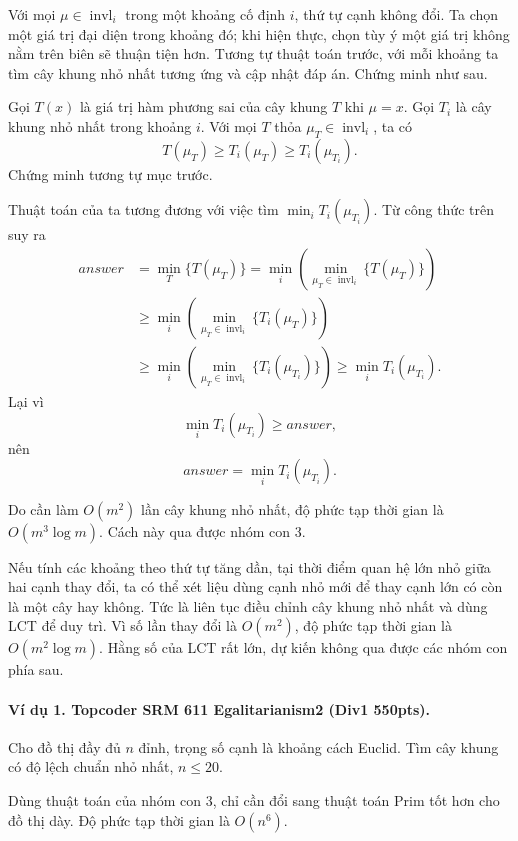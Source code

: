 \documentclass[11pt]{article}
\begin{document}
Với mọi \(\mu\in\operatorname{invl}_i\) trong một khoảng cố định \(i\), thứ tự
cạnh không đổi. Ta chọn một giá trị đại diện trong khoảng đó; khi hiện thực,
chọn tùy ý một giá trị không nằm trên biên sẽ thuận tiện hơn. Tương tự thuật
toán trước, với mỗi khoảng ta tìm cây khung nhỏ nhất tương ứng và cập nhật đáp
án. Chứng minh như sau.

Gọi \(T(x)\) là giá trị hàm phương sai của cây khung \(T\) khi \(\mu=x\). Gọi
\(T_i\) là cây khung nhỏ nhất trong khoảng \(i\). Với mọi \(T\) thỏa
\(\mu_T\in\operatorname{invl}_i\), ta có
\[
  T(\mu_T)\ge T_i(\mu_T)\ge T_i(\mu_{T_i}). \tag{3.4}
\]
Chứng minh tương tự mục trước.

Thuật toán của ta tương đương với việc tìm \(\min_i T_i(\mu_{T_i})\). Từ công
thức trên suy ra
\[
\begin{aligned}
  \textit{answer}
  &=\min_T\{T(\mu_T)\}
    =\min_i\left(\min_{\mu_T\in\operatorname{invl}_i}\{T(\mu_T)\}\right)\\
  &\ge \min_i\left(\min_{\mu_T\in\operatorname{invl}_i}\{T_i(\mu_T)\}\right)\\
  &\ge \min_i\left(\min_{\mu_T\in\operatorname{invl}_i}
      \{T_i(\mu_{T_i})\}\right)
    \ge \min_i T_i(\mu_{T_i}).
\end{aligned}
\]
Lại vì
\[
  \min_i T_i(\mu_{T_i})\ge \textit{answer},
\]
nên
\[
  \textit{answer}=\min_i T_i(\mu_{T_i}).
\]

Do cần làm \(O(m^2)\) lần cây khung nhỏ nhất, độ phức tạp thời gian là
\(O(m^3\log m)\). Cách này qua được nhóm con 3.

Nếu tính các khoảng theo thứ tự tăng dần, tại thời điểm quan hệ lớn nhỏ giữa
hai cạnh thay đổi, ta có thể xét liệu dùng cạnh nhỏ mới để thay cạnh lớn có còn
là một cây hay không. Tức là liên tục điều chỉnh cây khung nhỏ nhất và dùng LCT
để duy trì. Vì số lần thay đổi là \(O(m^2)\), độ phức tạp thời gian là
\(O(m^2\log m)\). Hằng số của LCT rất lớn, dự kiến không qua được các nhóm con
phía sau.

\paragraph{Ví dụ 1. Topcoder SRM 611 Egalitarianism2 (Div1 550pts).}
Cho đồ thị đầy đủ \(n\) đỉnh, trọng số cạnh là khoảng cách Euclid. Tìm cây khung
có độ lệch chuẩn nhỏ nhất, \(n\le 20\).

Dùng thuật toán của nhóm con 3, chỉ cần đổi sang thuật toán Prim tốt hơn cho đồ
thị dày. Độ phức tạp thời gian là \(O(n^6)\).
\end{document}
